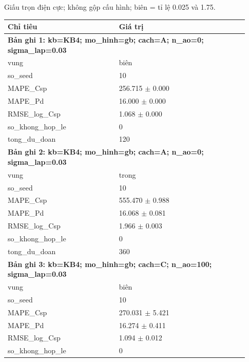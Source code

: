 \par\smallskip\noindent Giấu trọn điện cực; không gộp cấu hình; biên = tỉ lệ 0.025 và 1.75.\par
\begin{longtable}{p{0.43\linewidth}p{0.50\linewidth}}
\toprule Chỉ tiêu & Giá trị \\ \midrule \endhead
\multicolumn{2}{p{0.95\linewidth}}{\textbf{Bản ghi 1: kb=KB4; mo\_hinh=gb; cach=A; n\_ao=0; sigma\_lap=0.03}} \\
vung & biên \\
so\_\allowbreak seed & 10 \\
MAPE\_\allowbreak Csp & 256.715 $\pm$ 0.000 \\
MAPE\_\allowbreak Pd & 16.000 $\pm$ 0.000 \\
RMSE\_\allowbreak log\_\allowbreak Csp & 1.068 $\pm$ 0.000 \\
so\_\allowbreak khong\_\allowbreak hop\_\allowbreak le & 0 \\
tong\_\allowbreak du\_\allowbreak doan & 120 \\
\midrule
\multicolumn{2}{p{0.95\linewidth}}{\textbf{Bản ghi 2: kb=KB4; mo\_hinh=gb; cach=A; n\_ao=0; sigma\_lap=0.03}} \\
vung & trong \\
so\_\allowbreak seed & 10 \\
MAPE\_\allowbreak Csp & 555.470 $\pm$ 0.988 \\
MAPE\_\allowbreak Pd & 16.068 $\pm$ 0.081 \\
RMSE\_\allowbreak log\_\allowbreak Csp & 1.966 $\pm$ 0.003 \\
so\_\allowbreak khong\_\allowbreak hop\_\allowbreak le & 0 \\
tong\_\allowbreak du\_\allowbreak doan & 360 \\
\midrule
\multicolumn{2}{p{0.95\linewidth}}{\textbf{Bản ghi 3: kb=KB4; mo\_hinh=gb; cach=C; n\_ao=100; sigma\_lap=0.03}} \\
vung & biên \\
so\_\allowbreak seed & 10 \\
MAPE\_\allowbreak Csp & 270.031 $\pm$ 5.421 \\
MAPE\_\allowbreak Pd & 16.274 $\pm$ 0.411 \\
RMSE\_\allowbreak log\_\allowbreak Csp & 1.094 $\pm$ 0.012 \\
so\_\allowbreak khong\_\allowbreak hop\_\allowbreak le & 0 \\

\end{longtable}
